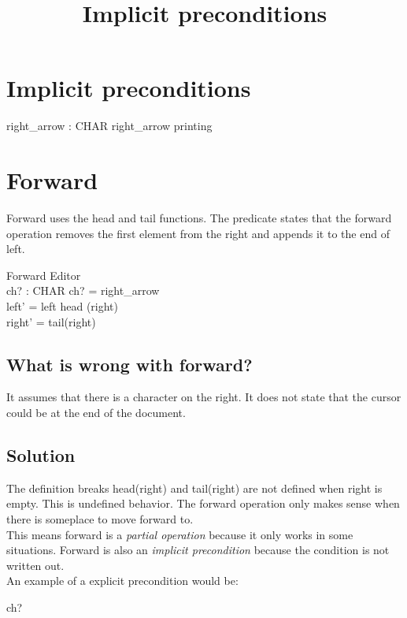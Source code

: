 \documentclass{article}
\title{Implicit preconditions}
\begin{document}
\maketitle

\section{Implicit preconditions}

\begin{zed}
    right\_arrow : CHAR
    \where
    right\_arrow \notin printing
\end{zed}

\section {Forward}
Forward uses the head and tail functions. The predicate states that the forward operation removes the first element from the right and appends it to the end of left.

\begin{schema}{Forward}
    \Delta Editor \\
    ch? : CHAR
    \where
    ch? = right\_arrow \\
    left' = left \cat \langle head (right) \rangle \\
    right' = tail(right)
\end{schema}

\subsection{What is wrong with forward?}
It assumes that there is a character on the right. It does not state that the cursor could be at the end of the document.

\subsection{Solution}
The definition breaks head(right) and tail(right) are not defined when right is empty. This is undefined behavior. The forward operation only makes sense when there is someplace to move forward to. \\

\noindent
This means forward is a \textit{partial operation} because it only works in some situations. Forward is also an \textit{implicit precondition} because the condition is not written out. \\

An example of a explicit precondition would be:
\begin{zed}
ch? \neq \langle \rangle
\end {zed}
\end{document}
